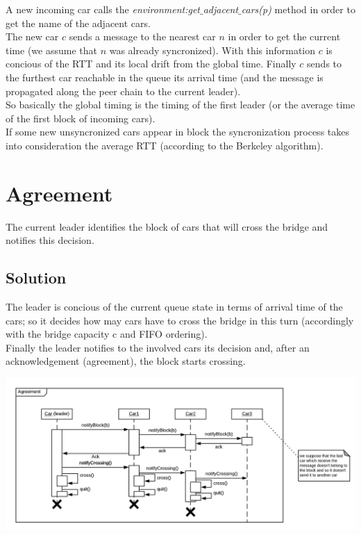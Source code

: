 A new incoming car calls the \textit{environment:get$\_$adjacent$\_$cars(p)} 
method in order to get the name of the adjacent cars. \\

The new car $c$ sends a message to the nearest car $n$ in order to get the current time 
(we assume that $n$ was already syncronized). 
With this information $c$ is concious of the RTT and its local drift from the global time. 
Finally $c$ sends to the furthest car 
reachable in the queue its arrival time (and the message is propagated along the 
peer chain to the current leader).\\

So basically the global timing is the timing of the first leader (or the average time 
of the first block of incoming cars).\\

If some new unsyncronized cars appear in block the syncronization process takes into 
consideration the average RTT (according to the Berkeley algorithm). 


\section{Agreement}

The current leader identifies the block of cars that will cross the bridge and notifies
this decision.  

\subsection{Solution}

The leader is concious of the current queue state in terms of arrival time of the cars; 
so it decides how may cars have to cross the bridge in this turn (accordingly with the 
bridge capacity c and FIFO ordering).\\

Finally the leader notifies to the involved cars its decision and, after 
an acknowledgement (agreement), the block starts crossing. 

\begin{center}
    \includegraphics[scale=0.6]{assets/ds2019_3.png}
\end{center}


